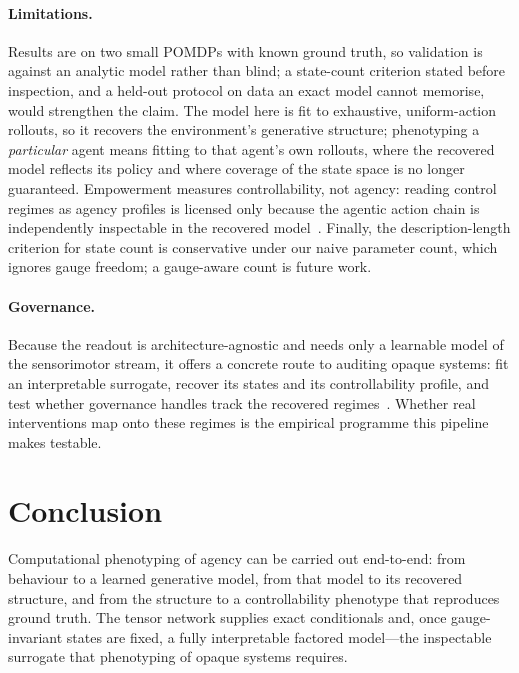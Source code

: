 \documentclass[runningheads]{llncs}
\begin{document}
\paragraph{Limitations.} Results are on two small POMDPs with known ground truth, so
validation is against an analytic model rather than blind; a state-count criterion
stated before inspection, and a held-out protocol on data an exact model cannot
memorise, would strengthen the claim. The model here is fit to exhaustive, uniform-action
rollouts, so it recovers the environment's generative structure; phenotyping a
\emph{particular} agent means fitting to that agent's own rollouts, where the recovered
model reflects its policy and where coverage of the state space is no longer guaranteed.
Empowerment measures controllability, not agency:
reading control regimes as agency profiles is licensed only because the agentic action
chain is independently inspectable in the recovered model~\cite{wilsonAgency2025}.
Finally, the description-length criterion for state count is conservative under our
naive parameter count, which ignores gauge freedom; a gauge-aware count is future work.

\paragraph{Governance.} Because the readout is architecture-agnostic and needs only a
learnable model of the sensorimotor stream, it offers a concrete route to auditing
opaque systems: fit an interpretable surrogate, recover its states and its
controllability profile, and test whether governance handles track the recovered
regimes~\cite{wilsonAgency2025}. Whether real interventions map onto these regimes is
the empirical programme this pipeline makes testable.

\section{Conclusion}
Computational phenotyping of agency can be carried out end-to-end: from behaviour to a
learned generative model, from that model to its recovered structure, and from the
structure to a controllability phenotype that reproduces ground truth. The tensor
network supplies exact conditionals and, once gauge-invariant states are fixed, a fully
interpretable factored model---the inspectable surrogate that phenotyping of opaque
systems requires.
\end{document}
